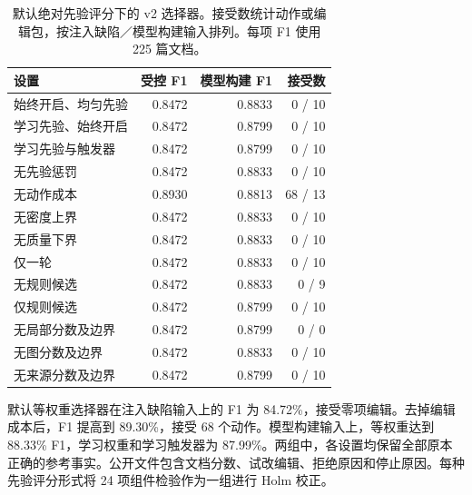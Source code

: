 \begin{table}[t]

\centering

\caption{默认绝对先验评分下的 v2 选择器。接受数统计动作或编辑包，按注入缺陷／模型构建输入排列。每项 F1 使用 225 篇文档。}
\label{tab:optimizer_complete}

\small

\begin{tabular}{lrrr}

\toprule

设置 & 受控 F1 & 模型构建 F1 & 接受数 \\

\midrule

始终开启、均匀先验 & 0.8472 & 0.8833 & 0 / 10 \\

学习先验、始终开启 & 0.8472 & 0.8799 & 0 / 10 \\

学习先验与触发器 & 0.8472 & 0.8799 & 0 / 10 \\

无先验惩罚 & 0.8472 & 0.8833 & 0 / 10 \\

无动作成本 & 0.8930 & 0.8813 & 68 / 13 \\

无密度上界 & 0.8472 & 0.8833 & 0 / 10 \\

无质量下界 & 0.8472 & 0.8833 & 0 / 10 \\

仅一轮 & 0.8472 & 0.8833 & 0 / 10 \\

无规则候选 & 0.8472 & 0.8833 & 0 / 9 \\

仅规则候选 & 0.8472 & 0.8799 & 0 / 10 \\

无局部分数及边界 & 0.8472 & 0.8799 & 0 / 0 \\

无图分数及边界 & 0.8472 & 0.8833 & 0 / 10 \\

无来源分数及边界 & 0.8472 & 0.8799 & 0 / 10 \\

\bottomrule

\end{tabular}

\end{table}

默认等权重选择器在注入缺陷输入上的 F1 为 84.72\%，接受零项编辑。去掉编辑成本后，F1 提高到 89.30\%，接受 68 个动作。模型构建输入上，等权重达到 88.33\% F1，学习权重和学习触发器为 87.99\%。两组中，各设置均保留全部原本正确的参考事实。公开文件包含文档分数、试改编辑、拒绝原因和停止原因。每种先验评分形式将 24 项组件检验作为一组进行 Holm 校正。


